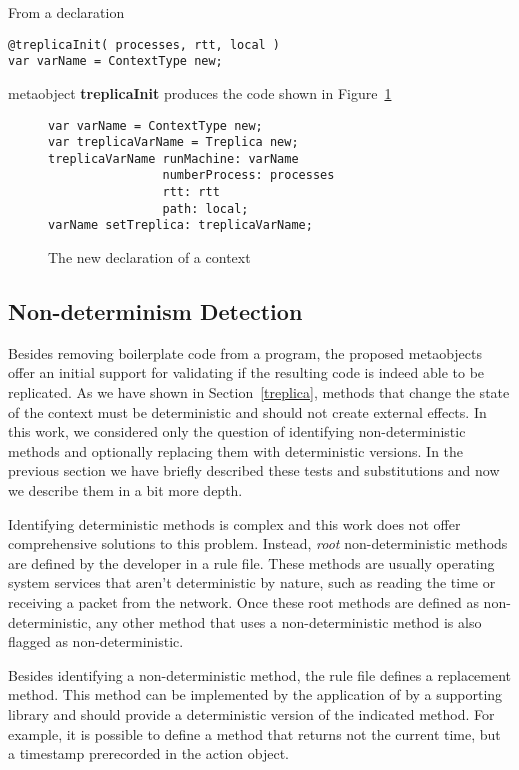 \documentclass[preprint,review]{elsarticle}
\newcommand{\srcstyle}[1]{\ttfamily\textbf{#1}\rmfamily}
\begin{document}
From a declaration
\begin{lstlisting}
@treplicaInit( processes, rtt, local )
var varName = ContextType new;
\end{lstlisting}
metaobject   \srcstyle{treplicaInit}  produces   the  code   shown  in
Figure~\ref{fig:newdec}

\begin{figure}[hp]
\centering
\begin{lstlisting}
var varName = ContextType new;
var treplicaVarName = Treplica new;
treplicaVarName runMachine: varName
                numberProcess: processes
                rtt: rtt
                path: local;
varName setTreplica: treplicaVarName;
\end{lstlisting}
\caption{The new declaration of a context }
\label{fig:newdec}
\end{figure}


\subsection{Non-determinism Detection}

Besides  removing  boilerplate  code  from  a  program,  the  proposed
metaobjects offer an  initial support for validating  if the resulting
code  is  indeed  able  to  be   replicated.   As  we  have  shown  in
Section~\ref{treplica}, methods  that change the state  of the context
must be deterministic and should  not create external effects. In this
work, we considered only the question of identifying non-deterministic
methods and optionally replacing  them with deterministic versions. In
the  previous  section  we  have briefly  described  these  tests  and
substitutions and now we describe them in a bit more depth.

Identifying deterministic  methods is complex  and this work  does not
offer comprehensive  solutions to this problem.   Instead, \emph{root}
non-deterministic  methods are  defined  by the  developer  in a  rule
file. These methods are usually  operating system services that aren't
deterministic  by nature,  such as  reading  the time  or receiving  a
packet  from the  network.  Once  these  root methods  are defined  as
non-deterministic,  any other  method  that  uses a  non-deterministic
method is also flagged as non-deterministic.

Besides identifying a non-deterministic  method, the rule file defines
a  replacement  method.   This  method   can  be  implemented  by  the
application  of  by   a  supporting  library  and   should  provide  a
deterministic  version of  the indicated  method. For  example, it  is
possible to define  a method that returns not the  current time, but a
timestamp prerecorded in the action object.
\end{document}
